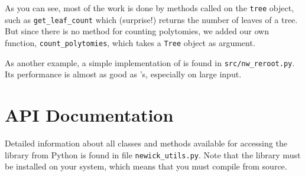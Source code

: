 


As you can see, most of the work is done by methods called on the \texttt{tree}
object, such as \texttt{get\_leaf\_count} which (surprise!) returns the number
of leaves of a tree. But since there is no method for counting polytomies, we
added our own function, \texttt{count\_polytomies}, which takes a \texttt{Tree}
object as argument.

As another example, a simple implementation of \reroot{} is found in
\texttt{src/nw\_reroot.py}. Its performance is almost as good as \reroot{}'s,
especially on large input.

\section{API Documentation}

\noindent{}Detailed information about all classes and methods available for accessing the \nutils{} library from Python is found in file \texttt{newick\_utils.py}. Note that the library must be installed on your system, which means that you must compile from source.
